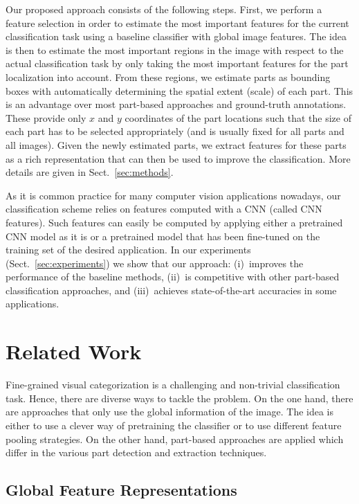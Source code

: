 \documentclass[runningheads]{llncs}
\begin{document}
Our proposed approach consists of the following steps.
First, we perform a feature selection in order to estimate the most important features for the current classification task using a baseline classifier with global image features.
The idea is then to estimate the most important regions in the image with respect to the actual classification task by only taking the most important features for the part localization into account.
From these regions, we estimate parts as bounding boxes with automatically determining the spatial extent (scale) of each part.
This is an advantage over most part-based approaches and ground-truth annotations.
These provide only $x$ and $y$ coordinates of the part locations such that the size of each part has to be selected appropriately (and is usually fixed for all parts and all images).
Given the newly estimated parts, we extract features for these parts as a rich representation that can then be used to improve the classification.
More details are given in Sect.~\ref{sec:methods}.

As it is common practice for many computer vision applications nowadays, our classification scheme relies on features computed with a CNN (called CNN features).
Such features can easily be computed by applying either a pretrained CNN model as it is or a pretrained model that has been fine-tuned on the training set of the desired application.
In our experiments (Sect.~\ref{sec:experiments}) we show that our approach: (i)~improves the performance of the baseline methods, (ii)~is competitive with other part-based classification approaches, and (iii)~achieves state-of-the-art accuracies in some applications.





 	\section{Related Work}
\label{sec:related_work}

Fine-grained visual categorization is a challenging and non-trivial classification task.
Hence, there are diverse ways to tackle the problem.
On the one hand, there are approaches that only use the global information of the image.
The idea is either to use a clever way of pretraining the classifier or to use different feature pooling strategies.
On the other hand, part-based approaches are applied which differ in the various part detection and extraction techniques.

\subsection{Global Feature Representations}
\label{sub:fine_grained_visual_categorization}
\end{document}

